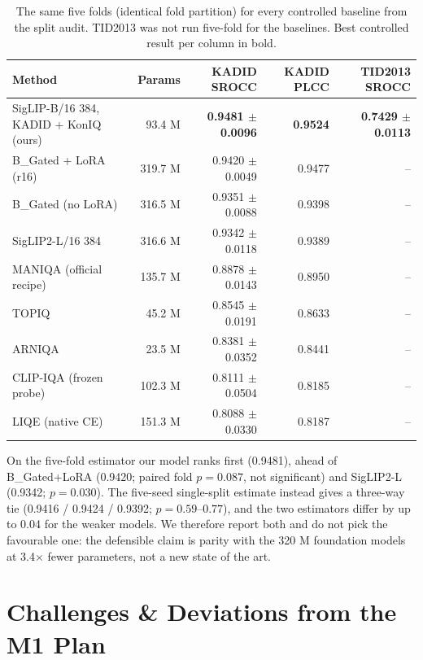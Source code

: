 \documentclass[11pt]{article}
\begin{document}
\begin{table}[H]
\centering
\small
\caption{The same five folds (identical fold partition) for every controlled baseline
from the split audit. TID2013 was not run five-fold for the baselines. Best controlled
result per column in bold.}
\label{tab:cv_baselines}
\setlength{\tabcolsep}{3pt}
\begin{tabular}{@{}lrrrr@{}}
\toprule
\textbf{Method} & \textbf{Params} & \textbf{KADID SROCC} & \textbf{KADID PLCC} & \textbf{TID2013 SROCC} \\
\midrule
SigLIP-B/16 384, KADID + KonIQ (ours) & 93.4 M & \textbf{0.9481 $\pm$ 0.0096} & \textbf{0.9524} & \textbf{0.7429 $\pm$ 0.0113} \\
B\_Gated + LoRA (r16)             & 319.7 M & 0.9420 $\pm$ 0.0049 & 0.9477 & -- \\
B\_Gated (no LoRA)                & 316.5 M & 0.9351 $\pm$ 0.0088 & 0.9398 & -- \\
SigLIP2-L/16 384                  & 316.6 M & 0.9342 $\pm$ 0.0118 & 0.9389 & -- \\
MANIQA (official recipe)          & 135.7 M & 0.8878 $\pm$ 0.0143 & 0.8950 & -- \\
TOPIQ                             & 45.2 M  & 0.8545 $\pm$ 0.0191 & 0.8633 & -- \\
ARNIQA                            & 23.5 M  & 0.8381 $\pm$ 0.0352 & 0.8441 & -- \\
CLIP-IQA (frozen probe)           & 102.3 M & 0.8111 $\pm$ 0.0504 & 0.8185 & -- \\
LIQE (native CE)                  & 151.3 M & 0.8088 $\pm$ 0.0330 & 0.8187 & -- \\
\bottomrule
\end{tabular}
\end{table}

On the five-fold estimator our model ranks first (0.9481), ahead of B\_Gated+LoRA
(0.9420; paired fold $p=0.087$, not significant) and SigLIP2-L (0.9342; $p=0.030$).
The five-seed single-split estimate instead gives a three-way tie (0.9416 / 0.9424 /
0.9392; $p=0.59$--$0.77$), and the two estimators differ by up to 0.04 for the weaker
models. We therefore report both and do not pick the favourable one: the defensible
claim is parity with the 320 M foundation models at 3.4$\times$ fewer parameters, not a
new state of the art.

\section{Challenges \& Deviations from the M1 Plan}
\label{sec:challenges}
\end{document}
